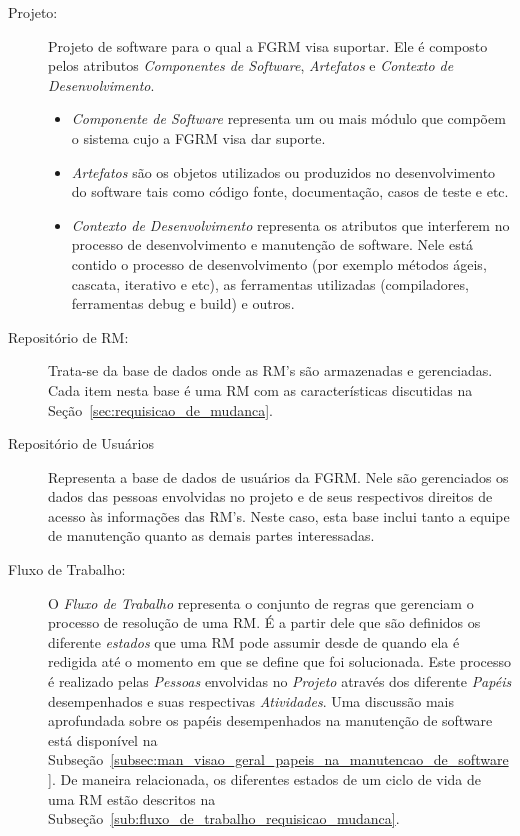 \begin{description}
	\item[Projeto:] Projeto de software para o qual a FGRM visa suportar.
		Ele é composto pelos atributos \textit{Componentes de Software},
		\textit{Artefatos} e \textit{Contexto de Desenvolvimento}.
		\begin{itemize}
			\item  \textit{Componente de Software} representa um ou mais módulo
				que compõem o sistema cujo a FGRM visa dar suporte.
			\item \textit{Artefatos} são os objetos utilizados ou produzidos no
				desenvolvimento do software tais como código fonte,
				documentação, casos de teste e etc.
			\item \textit{Contexto de Desenvolvimento} representa os atributos
				que interferem no processo de desenvolvimento e manutenção de
				software. Nele está contido o processo de desenvolvimento (por
				exemplo métodos ágeis, cascata, iterativo e etc), as ferramentas
				utilizadas (compiladores, ferramentas debug e build) e outros.
		\end{itemize}
	\item[Repositório de RM:] Trata-se da base de dados onde as RM's são
		armazenadas e gerenciadas. Cada item nesta base é uma RM com as
		características discutidas na Seção~\ref{sec:requisicao_de_mudanca}.
	\item[Repositório de Usuários] Representa a base de dados de usuários da
		FGRM. Nele são gerenciados os dados das pessoas envolvidas no projeto e
		de seus respectivos direitos de acesso às informações das RM's. Neste
		caso, esta base inclui tanto a equipe de manutenção quanto as demais
		partes interessadas.
	\item[Fluxo de Trabalho:] O \textit{Fluxo de Trabalho} representa o conjunto
		de regras que gerenciam o processo de resolução de uma RM. É a partir
		dele que são definidos os diferente \textit{estados} que uma RM pode
		assumir desde de quando ela é redigida até o momento em que se define
		que foi solucionada. Este processo é realizado pelas \textit{Pessoas}
		envolvidas no \textit{Projeto} através dos diferente \textit{Papéis}
		desempenhados e suas respectivas \textit{Atividades}. Uma discussão mais
		aprofundada sobre os papéis desempenhados na manutenção de software está
		disponível na
		Subseção~\ref{subsec:man_visao_geral_papeis_na_manutencao_de_software}.
		De maneira relacionada, os diferentes estados de um ciclo de vida de uma
		RM estão descritos na
		Subseção~\ref{sub:fluxo_de_trabalho_requisicao_mudanca}.
\end{description}

